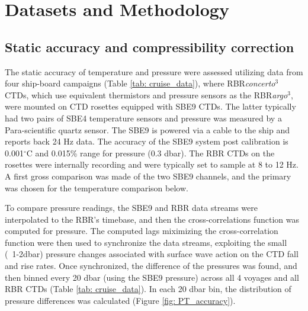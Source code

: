 \documentclass{ametsocV6.1}
\begin{document}
\section{Datasets and Methodology}
\label{sec: datasets}
\subsection{Static accuracy and compressibility correction}
\label{sec: static_datasets}
The static accuracy of temperature and pressure were assessed utilizing data from four ship-board campaigns (Table \ref{tab: cruise_data}), where RBR\textit{concerto}$^3$ CTDs, which use equivalent thermistors and pressure sensors as the RBR\textit{argo}$^3$, were mounted on CTD rosettes equipped with SBE9 CTDs. The latter typically had two pairs of SBE4 temperature sensors and pressure was measured by a Para-scientific quartz sensor. The SBE9 is powered via a cable to the ship and reports back 24 Hz data. The accuracy of the SBE9 system post calibration is 0.001$^\circ$C and 0.015\% range for pressure (0.3 dbar). The RBR CTDs on the rosettes were internally recording and were typically set to sample at 8 to 12 Hz.  A first gross comparison was made of the two SBE9 channels, and the primary was chosen for the temperature comparison below. 

To compare pressure readings, the SBE9 and RBR data streams were interpolated to the RBR's timebase, and then the cross-correlations function was computed  for pressure. 
The computed lags miximizing the cross-correlation function were then used to synchronize the data streams, exploiting the small (~1-2dbar) pressure changes associated with surface wave action on the CTD fall and rise rates. 
Once synchronized, the difference of the pressures was found, and then binned every 20 dbar (using the SBE9 pressure) across all 4 voyages and all RBR CTDs (Table \ref{tab: cruise_data}). 
In each 20 dbar bin, the distribution of pressure differences was calculated (Figure \ref{fig: PT_accuracy}). 
\end{document}
